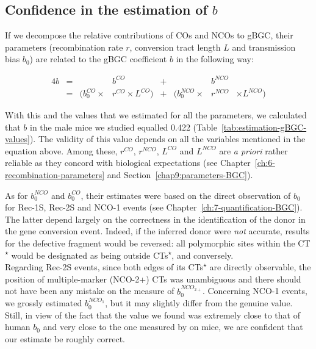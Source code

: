 \subsection{Confidence in the estimation of $b$}

If we decompose the relative contributions of COs and NCOs to gBGC, their parameters (recombination rate $r$, conversion tract length $L$ and transmission bias $b_0$) are related to the gBGC coefficient $b$ in the following way:

\begin{alignat*}{4}
	b&={}& 					   &b^{CO} 					&{}+{}& 					 &b^{NCO}& \\
	 &={}& ( b_{0}^{CO} \times &r^{CO} \times L^{CO} ) 	&{}+{}& ( b_{0}^{NCO} \times &r^{NCO}& \times L^{NCO} )
\end{alignat*}


With this and the values that we estimated for all the parameters, we calculated that $b$ in the male mice we studied equalled 0.422 (Table~\ref{tab:estimation-gBGC-values}).
The validity of this value depends on all the variables mentioned in the equation above.
Among these, $r^{CO}$, $r^{NCO}$, $L^{CO}$ and $L^{NCO}$ are \textit{a priori} rather reliable as they concord with biological expectations (see Chapter~\ref{ch:6-recombination-parameters} and Section~\ref{chap9:parameters-BGC}).

As for $b_{0}^{NCO}$ and $b_{0}^{CO}$, their estimates were based on the direct observation of $b_0$ for Rec-1S, Rec-2S and NCO-1 events (see Chapter~\ref{ch:7-quantification-BGC}).
The latter depend largely on the correctness in the identification of the donor in the gene conversion event. 
Indeed, if the inferred donor were \textit{not} accurate, results for the defective fragment would be reversed: all polymorphic sites within the CT\textsuperscript{$\star$} would be designated as being outside CTs\textsuperscript{$\star$}, and conversely. \\

Regarding Rec-2S events, since both edges of its CTs\textsuperscript{$\star$} are directly observable, the position of multiple-marker (NCO-2+) CTs was unambiguous and there should not have been any mistake on the measure of $b_0^{NCO_{2+}}$.
Concerning NCO-1 events, we grossly estimated $b_0^{NCO_1}$, but it may slightly differ from the genuine value. 
Still, in view of the fact that the value we found was extremely close to that of human $b_0$ and very close to the one measured by \citet{li2018highresolution} on mice, we are confident that our estimate be roughly correct.

